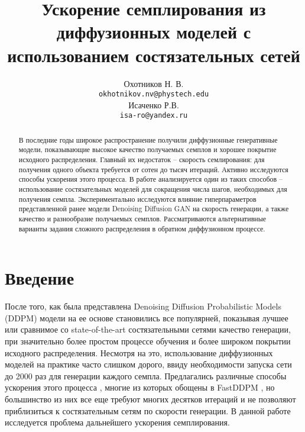 \documentclass{article}
\title{Ускорение семплирования из диффузионных моделей с использованием состязательных сетей}
\author{Охотников Н. В.\\
	\texttt{okhotnikov.nv@phystech.edu} \\
	\And
    Исаченко Р.В. \\
	\texttt{isa-ro@yandex.ru} \\
}
\date{}
\begin{document}
\maketitle
\begin{abstract}
	В последние годы широкое распространение получили диффузионные генеративные модели, показывающие высокое качество получаемых семплов и хорошее покрытие исходного распределения. Главный их недостаток -- скорость семлирования: для получения одного объекта требуется от сотен до тысяч итераций. Активно исследуются способы ускорения этого процесса. В работе анализируется один из таких способов -- использование состязательных моделей для сокращения числа шагов, необходимых для получения семпла. Экспериментально исследуются влияние гиперпараметров представленной ранее модели Denoising Diffusion GAN \cite{https://doi.org/10.48550/arxiv.2112.07804} на скорость генерации, а также качество и разнообразие получаемых семплов. Рассматриваются альтернативные варианты задания сложного распределения в обратном диффузионном процессе.
\end{abstract}

\section{Введение}
 После того, как была представлена Denoising Diffusion Probabilistic Models (DDPM) \cite{https://doi.org/10.48550/arxiv.2006.11239} модели на ее основе становились все популярней, показывая лучшее или сравнимое со state-of-the-art состязательными сетями \cite{https://doi.org/10.48550/arxiv.1812.04948} качество генерации\cite{https://doi.org/10.48550/arxiv.2105.05233}, при значительно более простом процессе обучения и более широком покрытии исходного распределения. Несмотря на это, использование диффузионных моделей на практике часто слишком дорого, ввиду необходимости запуска сети до 2000 раз для генерации каждого семпла. Предлагались различные способы ускорения этого процесса \cite{https://doi.org/10.48550/arxiv.2102.09672}, многие из которых обощены в FastDDPM \cite{https://doi.org/10.48550/arxiv.2106.00132}, но большинство из них все еще требуют многих десятков итераций и не позволяют приблизиться к состязательным сетям по скорости генерации. В данной работе исследуется проблема дальнейшего ускорения семплирования.
 
\end{document}
